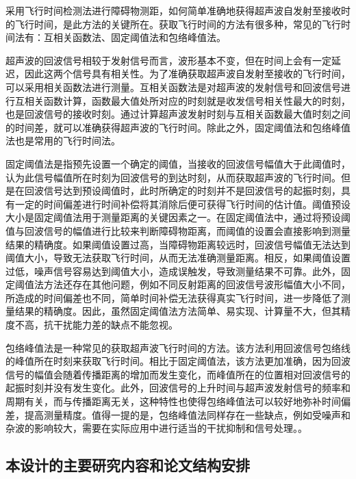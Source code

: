 	采用飞行时间检测法进行障碍物测距，如何简单准确地获得超声波自发射至接收时的飞行时间，是此方法的关键所在。获取飞行时间的方法有很多种，常见的飞行时间法有：互相关函数法、固定阈值法和包络峰值法。\par
	超声波的回波信号相较于发射信号而言，波形基本不变，但在时间上会有一定延迟，因此这两个信号具有相关性。为了准确获取超声波自发射至接收的飞行时间，可以采用相关函数法进行测量。互相关函数法是对超声波的发射信号和回波信号进行互相关函数计算，函数最大值处所对应的时刻就是收发信号相关性最大的时刻，也是回波信号的接收时刻。通过计算超声波发射时刻与互相关函数最大值时刻之间的时间差，就可以准确获得超声波的飞行时间。除此之外，固定阈值法和包络峰值法也是常用的飞行时间法。\par
	固定阈值法是指预先设置一个确定的阈值，当接收的回波信号幅值大于此阈值时，认为此信号幅值所在时刻为回波信号的到达时刻，从而获取超声波的飞行时间。但是在回波信号达到预设阈值时，此时所确定的时刻并不是回波信号的起振时刻，具有一定的时间偏差进行时间补偿将其消除后便可获得飞行时间的估计值。阈值预设大小是固定阈值法用于测量距离的关键因素之一。在固定阈值法中，通过将预设阈值与回波信号的幅值进行比较来判断障碍物距离，而阈值的设置会直接影响到测量结果的精确度。如果阈值设置过高，当障碍物距离较远时，回波信号幅值无法达到阈值大小，导致无法获取飞行时间，从而无法准确测量距离。相反，如果阈值设置过低，噪声信号容易达到阈值大小，造成误触发，导致测量结果不可靠。此外，固定阈值法方法还存在其他问题，例如不同反射距离的回波信号波形幅值大小不同，所造成的时间偏差也不同，简单时间补偿无法获得真实飞行时间，进一步降低了测量结果的精确度。因此，虽然固定阈值法方法简单、易实现、计算量不大，但其精度不高，抗干扰能力差的缺点不能忽视。\par
	包络峰值法是一种常见的获取超声波飞行时间的方法。该方法利用回波信号包络线的峰值所在时刻来获取飞行时间。相比于固定阈值法，该方法更加准确，因为回波信号的幅值会随着传播距离的增加而发生变化，而峰值所在的位置相对回波信号的起振时刻并没有发生变化。此外，回波信号的上升时间与超声波发射信号的频率和周期有关，而与传播距离无关，这种特性也使得包络峰值法可以较好地弥补时间偏差，提高测量精度。值得一提的是，包络峰值法同样存在一些缺点，例如受噪声和杂波的影响较大，需要在实际应用中进行适当的干扰抑制和信号处理。。
	       
\subsection{本设计的主要研究内容和论文结构安排}
